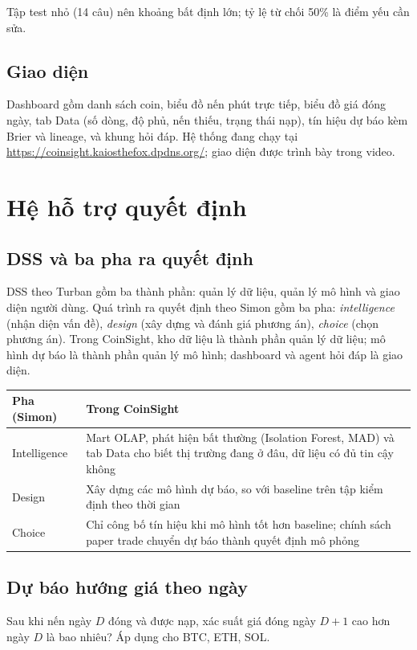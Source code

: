 \documentclass[11pt,a4paper]{article}
\begin{document}
Tập test nhỏ (14 câu) nên khoảng bất định lớn; tỷ lệ từ chối 50\% là điểm yếu cần sửa.

\subsection{Giao diện}
Dashboard gồm danh sách coin, biểu đồ nến phút trực tiếp, biểu đồ giá đóng ngày, tab Data (số
dòng, độ phủ, nến thiếu, trạng thái nạp), tín hiệu dự báo kèm Brier và lineage, và khung hỏi đáp.
Hệ thống đang chạy tại \url{https://coinsight.kaiosthefox.dpdns.org/}; giao diện được trình bày trong video.


\section{Hệ hỗ trợ quyết định}\label{sec:dss}

\subsection{DSS và ba pha ra quyết định}
DSS theo Turban gồm ba thành phần: quản lý dữ liệu, quản lý mô hình và giao diện người dùng.
Quá trình ra quyết định theo Simon gồm ba pha: \emph{intelligence} (nhận diện vấn đề),
\emph{design} (xây dựng và đánh giá phương án), \emph{choice} (chọn phương án). Trong CoinSight,
kho dữ liệu là thành phần quản lý dữ liệu; mô hình dự báo là thành phần quản lý mô hình;
dashboard và agent hỏi đáp là giao diện.

\begin{table}[H]
\centering\small
\begin{tabularx}{\linewidth}{lX}
\toprule
\textbf{Pha (Simon)} & \textbf{Trong CoinSight} \\
\midrule
Intelligence & Mart OLAP, phát hiện bất thường (Isolation Forest, MAD) và tab Data cho biết thị trường đang ở đâu, dữ liệu có đủ tin cậy không \\
Design & Xây dựng các mô hình dự báo, so với baseline trên tập kiểm định theo thời gian \\
Choice & Chỉ công bố tín hiệu khi mô hình tốt hơn baseline; chính sách paper trade chuyển dự báo thành quyết định mô phỏng \\
\bottomrule
\end{tabularx}
\end{table}

\subsection{Dự báo hướng giá theo ngày}
Sau khi nến ngày $D$ đóng và được nạp, xác suất giá đóng ngày $D+1$ cao hơn ngày
$D$ là bao nhiêu? Áp dụng cho BTC, ETH, SOL.
\end{document}
